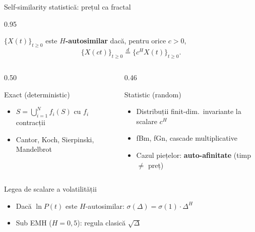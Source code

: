 \documentclass[9pt, aspectratio=169, t]{beamer}
\begin{document}
\begin{frame}[shrink=15]{Self-similarity statistică: prețul ca fractal}
\begin{cminipage}{0.95\textwidth}
\begin{defn}
$\{X(t)\}_{t\geq 0}$ este \textbf{$H$-autosimilar} dacă, pentru orice $c>0$,
\[
    \{X(ct)\}_{t\geq 0}\stackrel{d}{=}\{c^{H} X(t)\}_{t\geq 0}.
\]
\end{defn}
\begin{columns}[T]
\begin{column}{0.50\textwidth}
\begin{block}{Exact (deterministic)}
\begin{itemize}\setlength{\itemsep}{0pt}
    \item $S=\bigcup_{i=1}^N f_i(S)$ cu $f_i$ contracții
    \item Cantor, Koch, Sierpinski, Mandelbrot
\end{itemize}
\end{block}
\end{column}
\begin{column}{0.46\textwidth}
\begin{alertblock}{Statistic (random)}
\begin{itemize}\setlength{\itemsep}{0pt}
    \item Distribuții finit-dim.\ invariante la scalare $c^H$
    \item fBm, fGn, cascade multiplicative
    \item Cazul piețelor: \textbf{auto-afinitate} (timp $\neq$ preț)
\end{itemize}
\end{alertblock}
\end{column}
\end{columns}
\vspace{0.1cm}
\begin{exampleblock}{Legea de scalare a volatilității}
\begin{itemize}\setlength{\itemsep}{0pt}
    \item Dacă $\ln P(t)$ este $H$-autosimilar: $\sigma(\Delta)=\sigma(1)\cdot \Delta^{H}$
    \item Sub EMH ($H=0{,}5$): regula clasică $\sqrt{\Delta}$
\end{itemize}
\end{exampleblock}
\end{cminipage}
\end{frame}
\end{document}

